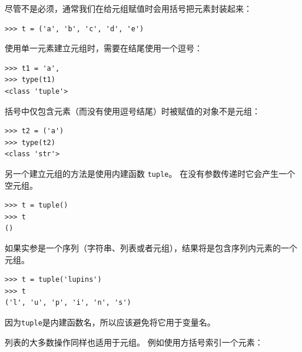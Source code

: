 尽管不是必须，通常我们在给元组赋值时会用括号把元素封装起来：


\begin{lstlisting}
>>> t = ('a', 'b', 'c', 'd', 'e')
\end{lstlisting}
%

使用单一元素建立元组时，需要在结尾使用一个逗号：


\begin{lstlisting}
>>> t1 = 'a',
>>> type(t1)
<class 'tuple'>
\end{lstlisting}
%

括号中仅包含元素（而没有使用逗号结尾）时被赋值的对象不是元组：

\begin{lstlisting}
>>> t2 = ('a')
>>> type(t2)
<class 'str'>
\end{lstlisting}
%

另一个建立元组的方法是使用内建函数 \lstinline{tuple}。 在没有参数传递时它会产生一个空元组。

\begin{lstlisting}
>>> t = tuple()
>>> t
()
\end{lstlisting}

%

如果实参是一个序列（字符串、列表或者元组），结果将是包含序列内元素的一个元组。

\begin{lstlisting}
>>> t = tuple('lupins')
>>> t
('l', 'u', 'p', 'i', 'n', 's')
\end{lstlisting}
%

因为\lstinline{tuple}是内建函数名，所以应该避免将它用于变量名。



列表的大多数操作同样也适用于元组。 例如使用方括号索引一个元素：


